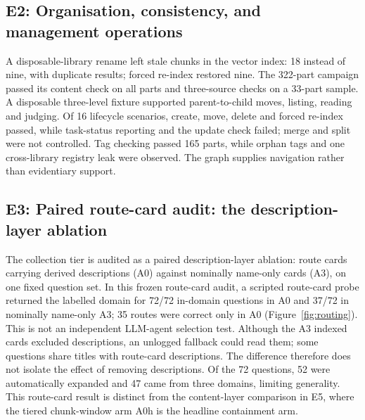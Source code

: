\subsection{E2: Organisation, consistency, and management operations}
\label{sec:e2}
A disposable-library rename left stale chunks in the vector index: 18 instead
of nine, with duplicate results; forced re-index restored nine. The 322-part
campaign passed its content check on all parts and three-source checks on a
33-part sample. A disposable three-level fixture supported parent-to-child
moves, listing, reading and judging. Of 16 lifecycle scenarios, create, move,
delete and forced re-index passed, while task-status reporting and the update
check failed; merge and split were not controlled. Tag checking passed 165
parts, while orphan tags and one cross-library registry leak were observed.
The graph supplies navigation rather than evidentiary support.

\subsection{E3: Paired route-card audit: the description-layer ablation}
\label{sec:routing-audit}
The collection tier is audited as a paired description-layer ablation: route
cards carrying derived descriptions (A0) against nominally name-only cards
(A3), on one fixed question set. In this frozen route-card audit, a scripted
route-card probe returned the labelled domain for 72/72 in-domain questions in
A0 and 37/72 in nominally name-only A3; 35 routes were correct only in A0
(Figure~\ref{fig:routing}). This is not an independent LLM-agent selection
test. Although the A3 indexed cards excluded descriptions, an unlogged fallback
could read them; some questions share titles with route-card descriptions. The
difference therefore does not isolate the effect of removing descriptions. Of
the 72 questions, 52 were automatically expanded and 47 came from three
domains, limiting generality. This route-card result is distinct from the
content-layer comparison in E5, where the tiered chunk-window arm A0h is the
headline containment arm.

